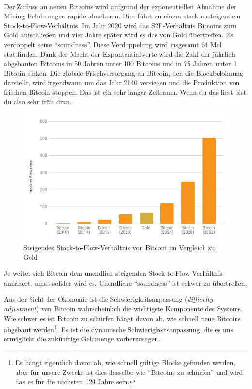 \paragraph{}
Der Zufluss an neuen Bitcoins wird aufgrund der exponentiellen Abnahme der
Mining Belohnungen rapide abnehmen. Dies führt zu einem stark ansteigendem
Stock-to-Flow-Verhältnis. Im Jahr 2020 wird das S2F-Verhältnis Bitcoins zum Gold
aufschließen und vier Jahre später wird es das von Gold übertreffen. Es
verdoppelt seine \enquote{soundness}. Diese Verdoppelung wird insgesamt 64 Mal
stattfinden. Dank der Macht der Expontentialwerte wird die Zahl der jährlich
abgebauten Bitcoins in 50 Jahren unter 100 Bitcoins und in 75 Jahren unter 1
Bitcoin sinken. Die globale Frischversorgung an Bitcoin, den die Blockbelohnung
darstellt, wird irgendwann um das Jahr 2140 versiegen und die Produktion von
frischen Bitcoin stoppen. Das ist ein sehr langer Zeitraum. Wenn du das liest
bist du also sehr früh dran.

\begin{figure}
  \includegraphics{assets/images/soundness-over-time.png}
  \caption{Steigendes Stock-to-Flow-Verhältnis von Bitcoin im Vergleich zu Gold}
  \label{fig:soundness-over-time}
\end{figure}

Je weiter sich Bitcoin dem unendlich steigenden Stock-to-Flow Verhältnis
annähert, umso solider wird es. Unendliche \enquote{soundness} ist schwer zu
übertreffen.

Aus der Sicht der Ökonomie ist die Schwierigkeitsanpassung
(\textit{difficulty-adjustment}) von Bitcoin wahrscheinlich die wichtigste
Komponente des Systems. Wie schwer es ist Bitcoin zu schürfen hängt davon ab,
wie schnell neue Bitcoins abgebaut werden\footnote{Es hängt eigentlich davon ab,
wie schnell gültige Blöcke gefunden werden, aber für unsere Zwecke ist dies
dasselbe wie \enquote{Bitcoins zu schürfen} und wird das es für die nächsten 120
Jahre sein.}. Es ist die dynamische Schwierigkeitsanpassung, die es uns
ermöglicht die zukünftige Geldmenge vorherzusagen.

